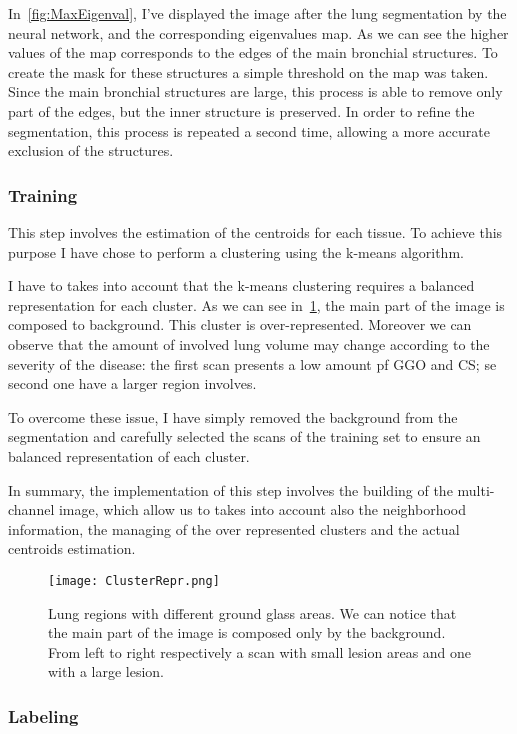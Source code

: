 \documentclass{standalone}
\begin{document}
	In \figurename\,\ref{fig:MaxEigenval}, I've displayed the image after the lung segmentation by the neural network, and the corresponding eigenvalues map. As we can see the higher values of the map corresponds to the edges of the main bronchial structures. To create the mask for these structures a simple threshold on the map was taken. Since the main bronchial structures are large, this process is able to remove only part of the edges, but the inner structure is preserved. In order to refine the segmentation, this process is repeated a second time, allowing a more accurate exclusion of the structures.
	
	\subsubsection*{Training}
	
	This step involves the estimation of the centroids for each tissue. To achieve this purpose I have chose to perform a clustering using the k-means algorithm. 
	
	I have to takes into account that the k-means clustering requires a balanced representation for each cluster. As we can see in \figurename\,\ref{fig:ClusterRepr}, the main part of the image is composed to background. This cluster is over-represented. Moreover we can observe that the amount of involved lung volume may change according to the  severity of the disease: the first scan presents a low amount pf GGO and CS; se second one have a larger region involves.
	
	To overcome these issue, I have simply removed the background from the segmentation and carefully selected the scans of the training set to ensure an balanced representation of each cluster.

	In summary, the implementation of this step involves the building of the multi-channel image, which allow us to takes into account also the neighborhood information, the managing of the over represented clusters and the actual centroids estimation.
	
	\begin{figure}[h!]
		\centering
			\texttt{[image: ClusterRepr.png]}
			\caption{Lung regions with different ground glass areas. We can notice that the main part of the image is composed only by the background. From left to right respectively a scan with small lesion areas and one with a large lesion. }\label{fig:ClusterRepr}
	\end{figure}

	\subsubsection*{Labeling}
	
\end{document}
